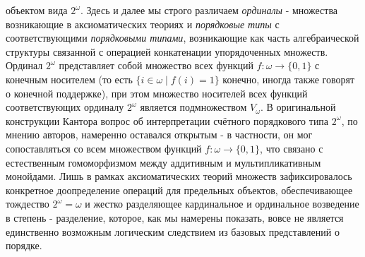 \documentclass[12pt]{article}
\begin{document}
объектом вида $2^{\omega}$. Здесь и далее мы строго различаем {\it ординалы} - множества возникающие в аксиоматических теориях и {\it порядковые типы} с соответствующими {\it порядковыми типами}, возникающие как часть алгебраической структуры связанной с операцией конкатенации упорядоченных множеств. Ординал $2^{\omega}$ представляет собой множество всех функций $f : \omega \to \{ 0, 1 \}$ с конечным носителем (то есть $\{ i \in \omega \mid f(i) = 1 \}$ конечно, иногда также говорят о конечной поддержке), при этом множество носителей всех функций соответствующих ординалу $2^{\omega}$ является подмножеством $V_{\omega}$. В оригинальной конструкции Кантора вопрос об интерпретации счётного порядкового типа $2^{\omega}$, по мнению авторов, намеренно оставался открытым - в частности, он мог сопоставляться со всем множеством функций $f : \omega \to \{0, 1\}$, что связано с естественным гомоморфизмом между аддитивным и мультипликативным монойдами. Лишь в рамках аксиоматических теорий множеств зафиксировалось конкретное доопределение операций для предельных объектов, обеспечивающее тождество $2^{\omega} = \omega$ и жестко разделяющее кардинальное и ординальное возведение в степень - разделение, которое, как мы намерены показать, вовсе не является единственно возможным логическим следствием из базовых представлений о порядке. 
\end{document}
